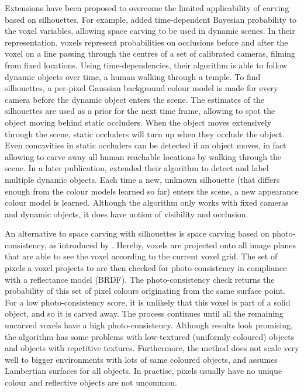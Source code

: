 Extensions have been proposed to overcome the limited applicability of carving based on silhouettes. For example, \GuanOld added time-dependent Bayesian probability to the voxel variables, allowing space carving to be used in dynamic scenes. In their representation, voxels represent probabilities on occlusions before and after the voxel on a line passing through the centres of a set of calibrated cameras, filming from fixed locations. Using time-dependencies, their algorithm is able to follow dynamic objects over time, \eg a human walking through a temple. To find silhouettes, a per-pixel Gaussian background colour model is made for every camera before the dynamic object enters the scene. The estimates of the silhouettes are used as a prior for the next time frame, allowing to spot the object moving behind static occluders. When the object moves extensively through the scene, static occluders will turn up when they occlude the object. Even concavities in static occluders can be detected if an object moves, in fact allowing to carve away all human reachable locations by walking through the scene. In a later publication,  extended their algorithm to detect and label multiple dynamic objects. Each time a new, unknown silhouette (that differs enough from the colour models learned so far) enters the scene, a new appearance colour model is learned. Although the algorithm only works with fixed cameras and dynamic objects, it does have notion of visibility and occlusion.

An alternative to space carving with silhouettes is space carving based on photo-consistency, as introduced by \SeitzOld. Hereby, voxels are projected onto all image planes that are able to see the voxel according to the current voxel grid. The set of pixels a voxel projects to are then checked for photo-consistency in compliance with a reflectance model (BRDF). The photo-consistency check returns the probability of this set of pixel colours originating from the same surface point. For a low photo-consistency score, it is unlikely that this voxel is part of a solid object, and so it is carved away. The process continues until all the remaining uncarved voxels have a high photo-consistency. Although results look promising, the algorithm has some problems with low-textured (\ie uniformly coloured) objects and objects with repetitive textures. Furthermore, the method does not scale very well to bigger environments with lots of same coloured objects, and assumes Lambertian surfaces for all objects. In practise, pixels usually have no unique colour and reflective objects are not uncommon.

